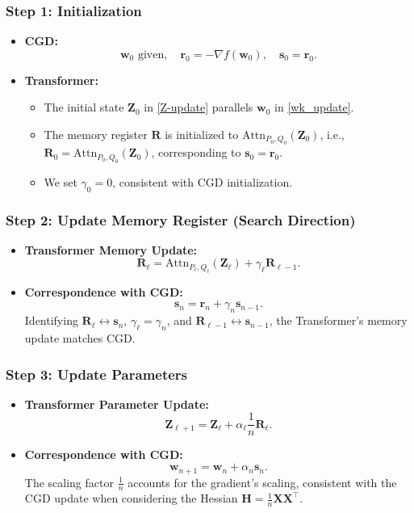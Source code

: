 \documentclass[11pt]{article}
\numberwithin{equation}{section}
\begin{document}
\subsubsection*{Step 1: Initialization}
\begin{itemize}
    \item \textbf{CGD:}
    \[
    \mathbf{w}_0 \text{ given}, \quad \mathbf{r}_0 = -\nabla f(\mathbf{w}_0), \quad \mathbf{s}_0 = \mathbf{r}_0.
    \]
    \item \textbf{Transformer:}
    \begin{itemize}
        \item The initial state \( \mathbf{Z}_0 \) in \eqref{Z-update} parallels \( \mathbf{w}_0 \) in \eqref{wk_update}.
        \item The memory register \( \mathbf{R} \) is initialized to \(\mathrm{Attn}_{P_0, Q_0}(\mathbf{Z}_0)\), i.e., \( \mathbf{R}_{0} =  \mathrm{Attn}_{P_0, Q_0}(\mathbf{Z}_0)\), corresponding to \( \mathbf{s}_{0} = \mathbf{r}_0 \).
        \item We set \( \gamma_0 = 0 \), consistent with CGD initialization.
    \end{itemize}
\end{itemize}

\subsubsection*{Step 2: Update Memory Register (Search Direction)}
\begin{itemize}
    \item \textbf{Transformer Memory Update:}
    \[
    \mathbf{R}_\ell = \mathrm{Attn}_{P_\ell, Q_\ell}(\mathbf{Z}_\ell) + \gamma_\ell \mathbf{R}_{\ell-1}.
    \]
    \item \textbf{Correspondence with CGD:}
    \[
    \mathbf{s}_n = \mathbf{r}_n + \gamma_n \mathbf{s}_{n-1}.
    \]
    Identifying \( \mathbf{R}_\ell \leftrightarrow \mathbf{s}_n \), \( \gamma_\ell = \gamma_n \), and \( \mathbf{R}_{\ell-1} \leftrightarrow \mathbf{s}_{n-1} \), the Transformer's memory update matches CGD.
\end{itemize}

\subsubsection*{Step 3: Update Parameters}
\begin{itemize}
    \item \textbf{Transformer Parameter Update:}
    \[
    \mathbf{Z}_{\ell+1} = \mathbf{Z}_\ell + \alpha_\ell \frac{1}{n} \mathbf{R}_\ell.
    \]
    \item \textbf{Correspondence with CGD:}
    \[
    \mathbf{w}_{n+1} = \mathbf{w}_n + \alpha_n \mathbf{s}_n.
    \]
    The scaling factor \( \frac{1}{n} \) accounts for the gradient's scaling, consistent with the CGD update when considering the Hessian \( \mathbf{H} = \frac{1}{n} \mathbf{X} \mathbf{X}^\top \).
\end{itemize}
\end{document}
